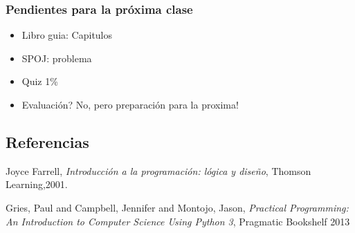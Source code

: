 \documentclass[xcolor=svgnames]{beamer}
\theoremstyle{example}
\begin{document}
\begin{frame}
  \frametitle{Pendientes para la próxima clase}
  \begin{itemize}
  \item{Libro guia: Capitulos }
    \item{SPOJ: problema }
  \item{Quiz 1\%}
  \item{Evaluación? No, pero preparación para la proxima!}
  \end{itemize}
\end{frame}

\subsection{Referencias}

\begin{thebibliography}{9}
  Joyce Farrell,
 \emph{Introducción a la programación: lógica y diseño},
 Thomson Learning,2001.

  Gries, Paul and Campbell, Jennifer and Montojo, Jason,
  \emph{Practical Programming: An Introduction to Computer Science Using Python 3},
  Pragmatic Bookshelf
  2013
 
\end{thebibliography}
\end{document}
